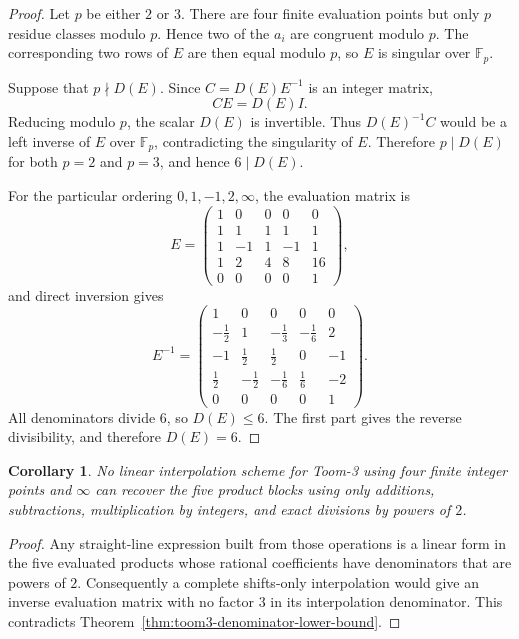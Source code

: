 \documentclass[11pt]{book}
\newtheorem{corollary}[theorem]{Corollary}
\theoremstyle{definition}
\begin{document}
\begin{proof}
Let $p$ be either $2$ or $3$.  There are four finite evaluation points but
only $p$ residue classes modulo $p$.  Hence two of the $a_i$ are congruent
modulo $p$.  The corresponding two rows of $E$ are then equal modulo $p$, so
$E$ is singular over $\mathbb F_p$.

Suppose that $p\nmid D(E)$.  Since $C=D(E)E^{-1}$ is an integer matrix,
\[
 CE=D(E)I.
\]
Reducing modulo $p$, the scalar $D(E)$ is invertible.  Thus
$D(E)^{-1}C$ would be a left inverse of $E$ over $\mathbb F_p$, contradicting
the singularity of $E$.  Therefore $p\mid D(E)$ for both $p=2$ and $p=3$,
and hence $6\mid D(E)$.

For the particular ordering $0,1,-1,2,\infty$, the evaluation matrix is
\[
 E=
 \begin{pmatrix}
 1&0&0&0&0\\
 1&1&1&1&1\\
 1&-1&1&-1&1\\
 1&2&4&8&16\\
 0&0&0&0&1
 \end{pmatrix},
\]
and direct inversion gives
\[
 E^{-1}=
 \begin{pmatrix}
 1&0&0&0&0\\
 -\frac12&1&-\frac13&-\frac16&2\\
 -1&\frac12&\frac12&0&-1\\
 \frac12&-\frac12&-\frac16&\frac16&-2\\
 0&0&0&0&1
 \end{pmatrix}.
\]
All denominators divide $6$, so $D(E)\leq6$.  The first part gives the
reverse divisibility, and therefore $D(E)=6$.
\end{proof}

\begin{corollary}\label{cor:toom3-no-shifts-only}
No linear interpolation scheme for Toom-3 using four finite integer points and
$\infty$ can recover the five product blocks using only additions,
subtractions, multiplication by integers, and exact divisions by powers of
$2$.
\end{corollary}

\begin{proof}
Any straight-line expression built from those operations is a linear form in
the five evaluated products whose rational coefficients have denominators
that are powers of $2$.  Consequently a complete shifts-only interpolation
would give an inverse evaluation matrix with no factor $3$ in its
interpolation denominator.  This contradicts
Theorem~\ref{thm:toom3-denominator-lower-bound}.
\end{proof}
\end{document}
